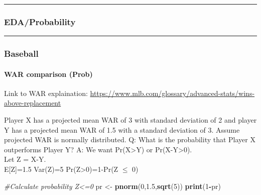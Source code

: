 \documentclass[]{article}
\newenvironment{Shaded}{\begin{snugshade}}{\end{snugshade}}
\newcommand{\CommentTok}[1]{\textcolor[rgb]{0.56,0.35,0.01}{\textit{#1}}}
\newcommand{\DecValTok}[1]{\textcolor[rgb]{0.00,0.00,0.81}{#1}}
\newcommand{\FloatTok}[1]{\textcolor[rgb]{0.00,0.00,0.81}{#1}}
\newcommand{\KeywordTok}[1]{\textcolor[rgb]{0.13,0.29,0.53}{\textbf{#1}}}
\newcommand{\NormalTok}[1]{#1}
\newcommand{\OperatorTok}[1]{\textcolor[rgb]{0.81,0.36,0.00}{\textbf{#1}}}
\newcommand{\StringTok}[1]{\textcolor[rgb]{0.31,0.60,0.02}{#1}}
\let\oldparagraph\paragraph
\renewcommand{\paragraph}[1]{\oldparagraph{#1}\mbox{}}
\begin{document}
\begin{Shaded}
\end{Shaded}

\begin{center}\rule{0.5\linewidth}{\linethickness}\end{center}

\hypertarget{edaprobability}{%
\subsubsection{EDA/Probability}\label{edaprobability}}

\begin{center}\rule{0.5\linewidth}{\linethickness}\end{center}

\hypertarget{baseball}{%
\subsubsection{Baseball}\label{baseball}}

\hypertarget{war-comparison-prob}{%
\paragraph{WAR comparison (Prob)}\label{war-comparison-prob}}

Link to WAR explaination:
\url{https://www.mlb.com/glossary/advanced-stats/wins-above-replacement}

Player X has a projected mean WAR of 3 with standard deviation of 2 and
player Y has a projected mean WAR of 1.5 with a standard deviation of 3.
Assume projected WAR is normally distributed. Q: What is the probability
that Player X outperforms Player Y? A: We want Pr(X\textgreater{}Y) or
Pr(X-Y\textgreater{}0).\\
Let Z = X-Y.\\
E{[}Z{]}=1.5 Var(Z)=5 Pr(Z\textgreater{}0)=1-Pr(Z \(\leq\) 0)

\begin{Shaded}
\begin{Highlighting}[]
\CommentTok{#Calculate probability Z<=0}
\NormalTok{pr <-}\StringTok{ }\KeywordTok{pnorm}\NormalTok{(}\DecValTok{0}\NormalTok{,}\FloatTok{1.5}\NormalTok{,}\KeywordTok{sqrt}\NormalTok{(}\DecValTok{5}\NormalTok{))}
\KeywordTok{print}\NormalTok{(}\DecValTok{1}\OperatorTok{-}\NormalTok{pr)}
\end{Highlighting}
\end{Shaded}
\end{document}
